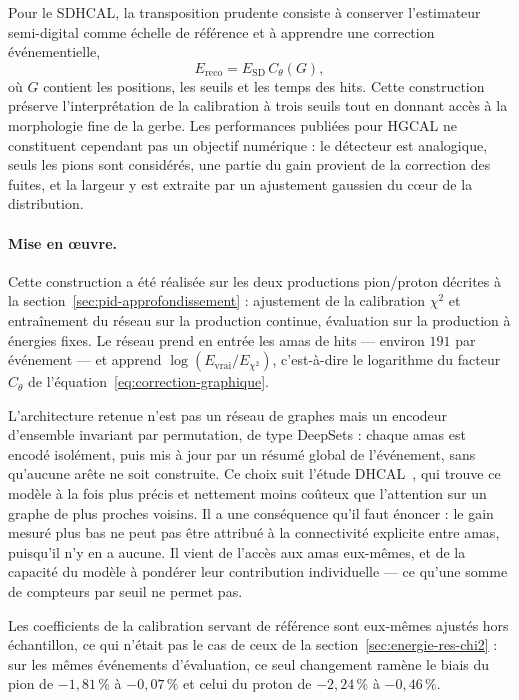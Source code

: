 Pour le SDHCAL, la transposition prudente consiste à conserver l'estimateur semi-digital comme échelle de référence et à apprendre une correction événementielle,
\begin{equation}
E_{\mathrm{reco}}=E_{\mathrm{SD}}\,C_{\theta}(G),
\label{eq:correction-graphique}
\end{equation}
où $G$ contient les positions, les seuils et les temps des hits. Cette construction préserve l'interprétation de la calibration à trois seuils tout en donnant accès à la morphologie fine de la gerbe. Les performances publiées pour HGCAL ne constituent cependant pas un objectif numérique : le détecteur est analogique, seuls les pions sont considérés, une partie du gain provient de la correction des fuites, et la largeur y est extraite par un ajustement gaussien du c\oe{}ur de la distribution.

\paragraph{Mise en \oe{}uvre.} Cette construction a été réalisée sur les deux productions pion/proton décrites à la section~\ref{sec:pid-approfondissement} : ajustement de la calibration $\chi^2$ et entraînement du réseau sur la production continue, évaluation sur la production à énergies fixes. Le réseau prend en entrée les amas de hits — environ $191$ par événement — et apprend $\log\!\left(E_{\mathrm{vrai}}/E_{\chi^2}\right)$, c'est-à-dire le logarithme du facteur $C_\theta$ de l'équation~\ref{eq:correction-graphique}.

L'architecture retenue n'est pas un réseau de graphes mais un encodeur d'ensemble invariant par permutation, de type DeepSets : chaque amas est encodé isolément, puis mis à jour par un résumé global de l'événement, sans qu'aucune arête ne soit construite. Ce choix suit l'étude DHCAL~\cite{borysova2025dhcalgnn}, qui trouve ce modèle à la fois plus précis et nettement moins coûteux que l'attention sur un graphe de plus proches voisins. Il a une conséquence qu'il faut énoncer : le gain mesuré plus bas ne peut pas être attribué à la connectivité explicite entre amas, puisqu'il n'y en a aucune. Il vient de l'accès aux amas eux-mêmes, et de la capacité du modèle à pondérer leur contribution individuelle — ce qu'une somme de compteurs par seuil ne permet pas.

Les coefficients de la calibration servant de référence sont eux-mêmes ajustés hors échantillon, ce qui n'était pas le cas de ceux de la section~\ref{sec:energie-res-chi2} : sur les mêmes événements d'évaluation, ce seul changement ramène le biais du pion de $-1{,}81\,\%$ à $-0{,}07\,\%$ et celui du proton de $-2{,}24\,\%$ à $-0{,}46\,\%$.

